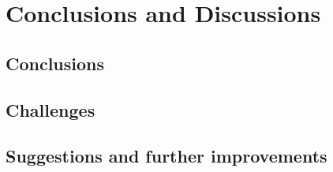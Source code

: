 \chapter{\ifenglish Conclusions and Discussions\else \fi}\label{ch:ifenglish-conclusions-and-discussionselse-fi}


\section{\ifenglish Conclusions\else \fi}\label{sec:ifenglish-conclusionselse-fi}


\section{\ifenglish Challenges\else \fi}\label{sec:ifenglish-challengeselse-fi}

\section{\ifenglish%
Suggestions and further improvements
\fi
}\label{sec:ifenglish
suggestions-and-further-improvements
}